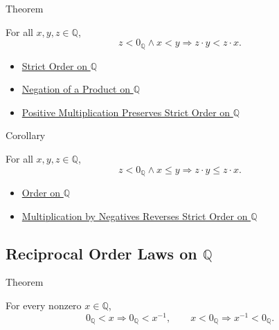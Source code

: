 \begin{theorembox}{Theorem}
\begin{theorem}
\label{thm:negative-multiplication-reverses-strict-order-on-q}
For all $x,y,z\in\mathbb{Q}$,
\[
z<0_{\mathbb{Q}}\land x<y
\Longrightarrow
z\cdot y<z\cdot x.
\]
\end{theorem}
\end{theorembox}

\begin{dependencies}
\begin{itemize}
  \item \hyperref[def:strict-order-on-q]{Strict Order on $\mathbb{Q}$}
  \item \hyperref[cor:negation-of-product-on-q]{Negation of a Product on $\mathbb{Q}$}
  \item \hyperref[thm:positive-multiplication-preserves-strict-order-on-q]{Positive Multiplication Preserves Strict Order on $\mathbb{Q}$}
\end{itemize}
\end{dependencies}

\begin{corollarybox}{Corollary}
\begin{corollary}
\label{cor:negative-multiplication-reverses-order-on-q}
For all $x,y,z\in\mathbb{Q}$,
\[
z<0_{\mathbb{Q}}\land x\le y
\Longrightarrow
z\cdot y\le z\cdot x.
\]
\end{corollary}
\end{corollarybox}

\begin{dependencies}
\begin{itemize}
  \item \hyperref[def:order-on-q]{Order on $\mathbb{Q}$}
  \item \hyperref[thm:negative-multiplication-reverses-strict-order-on-q]{Multiplication by Negatives Reverses Strict Order on $\mathbb{Q}$}
\end{itemize}
\end{dependencies}

\subsection*{\texorpdfstring{Reciprocal Order Laws on $\mathbb{Q}$}{Reciprocal Order Laws on Q}}

\begin{theorembox}{Theorem}
\begin{theorem}
\label{thm:sign-of-reciprocal-q}
For every nonzero $x\in\mathbb{Q}$,
\[
0_{\mathbb{Q}}<x \Longrightarrow 0_{\mathbb{Q}}<x^{-1},
\qquad
x<0_{\mathbb{Q}} \Longrightarrow x^{-1}<0_{\mathbb{Q}}.
\]
\end{theorem}
\end{theorembox}

